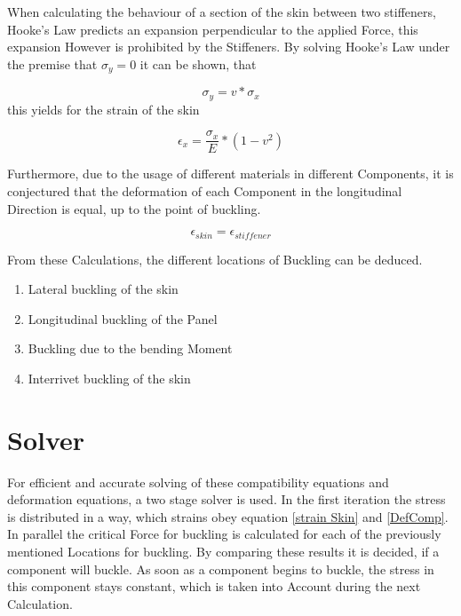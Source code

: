 \documentclass{article}
\begin{document}
	When calculating the behaviour of a section of the skin between two stiffeners, Hooke's Law predicts an expansion perpendicular to the applied Force, this expansion However is prohibited by the Stiffeners. By solving Hooke's Law under the premise that $\sigma_y = 0$ it can be shown, that
	
	\begin{equation} \label{Comp1}
		\sigma_y = v*\sigma_x
	\end{equation}
	this yields for the strain of the skin
	
	\begin{equation} \label{strain Skin}
		\epsilon_x = \frac{\sigma_x}{E}*(1-v^2)
	\end{equation}
	
	Furthermore, due to the usage of different materials in different Components, it is conjectured that the deformation of each Component in the longitudinal Direction is equal, up to the point of buckling. 
	
	\begin{equation} \label{DefComp}
		\epsilon_{skin} = \epsilon_{stiffener}
	\end{equation}
	
	
	From these Calculations, the different locations of Buckling can be deduced.
	\begin{enumerate}
		\item Lateral buckling of the skin
		\item Longitudinal buckling of the Panel
		\item Buckling due to the bending Moment
		\item Interrivet buckling of the skin
	\end{enumerate}

	\section{Solver}
	For efficient and accurate solving of these compatibility equations and deformation equations, a two stage solver is used. In the first iteration the stress is distributed in a way, which strains obey equation \ref{strain Skin} and \ref{DefComp}.\\
	In parallel the critical Force for buckling is calculated for each of the previously mentioned Locations for buckling.
	By comparing these results it is decided, if a component will buckle. As soon as a component begins to buckle, the stress in this component stays constant, which is taken into Account during the next Calculation.
	
\end{document}
